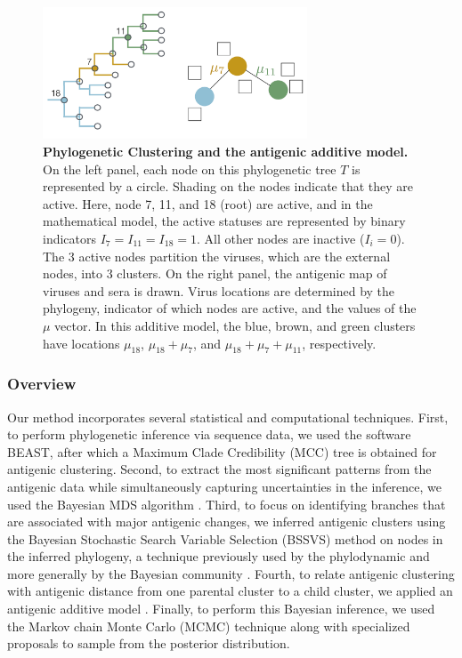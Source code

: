 \documentclass[11pt,oneside,letterpaper]{article}
\begin{document}
\begin{figure}[h]
	\centering		
	\includegraphics[width=0.7\textwidth]{figures/lineArt/schematicDiagram}
	\caption{\textbf{Phylogenetic Clustering and the antigenic additive model.} 
On the left panel, each node on this phylogenetic tree $T$ is represented by a circle. 
Shading on the nodes indicate that they are active.
Here, node 7, 11, and 18 (root) are active, and in the mathematical model, the active statuses are represented by binary indicators $I_{7}=I_{11}=I_{18} = 1$. 
All other nodes are inactive ($I_i=0$). 
The 3 active nodes partition the viruses, which are the external nodes, into 3 clusters.
On the right panel, the antigenic map of viruses and sera is drawn.
Virus locations are determined by the phylogeny, indicator of which nodes are active, and the values of the $\mu$ vector.
In this additive model, the blue, brown, and green clusters have locations $\mu_{18}$, $\mu_{18} + \mu_7$, and $\mu_{18}+ \mu_7 + \mu_{11}$, respectively.
	} 
	\label{additiveModel} 
\end{figure}


\subsubsection*{Overview}
Our method incorporates several statistical and computational techniques. 
First, to perform phylogenetic inference via sequence data, we used the software BEAST, after which a Maximum Clade Credibility (MCC) tree is obtained for antigenic clustering.
Second, to extract the most significant patterns from the antigenic data while simultaneously capturing uncertainties in the inference, we used the Bayesian MDS algorithm \cite{oh_bayesian_2001}.
Third, to focus on identifying branches that are associated with major antigenic changes, we inferred antigenic clusters using the Bayesian Stochastic Search Variable Selection (BSSVS) method on nodes in the inferred phylogeny, a technique previously used by the phylodynamic \cite{lemey_bayesian_2009, drummond_bayesian_2010} and more generally by the Bayesian community \cite{kuo_variable_1998, hugh_chipman_practical_2001}.
Fourth, to relate antigenic clustering with antigenic distance from one parental cluster to a child cluster, we applied an antigenic additive model \cite{drummond_bayesian_2010}.
Finally, to perform this Bayesian inference, we used the Markov chain Monte Carlo (MCMC) technique along with specialized proposals to sample from the posterior distribution. 
\end{document}
